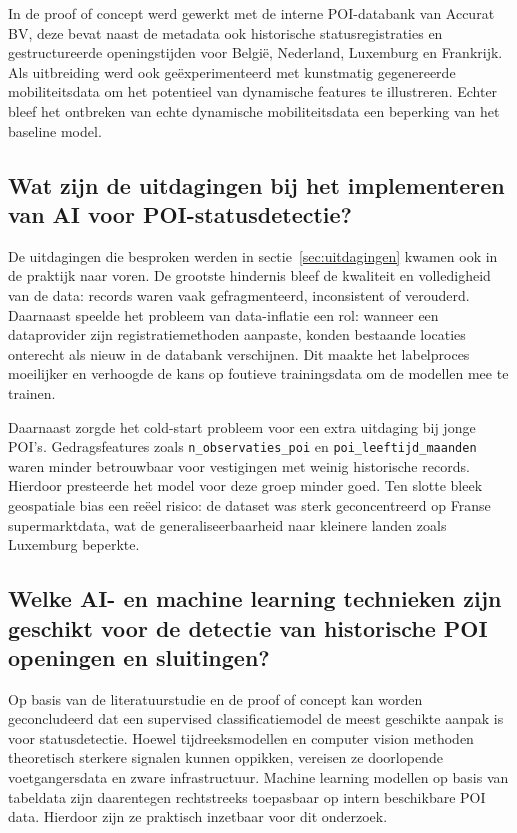 In de proof of concept werd gewerkt met de interne POI-databank van Accurat BV, deze bevat naast de metadata ook  historische statusregistraties en gestructureerde openingstijden voor België, Nederland, Luxemburg en Frankrijk. Als uitbreiding werd ook geëxperimenteerd met kunstmatig gegenereerde mobiliteitsdata om het potentieel van dynamische features te illustreren. Echter bleef het ontbreken van echte dynamische mobiliteitsdata een beperking van het baseline model.

\subsection{Wat zijn de uitdagingen bij het implementeren van AI voor POI-statusdetectie?}
De uitdagingen die besproken werden in sectie~\ref{sec:uitdagingen} kwamen ook in de praktijk naar voren. De grootste hindernis bleef de kwaliteit en volledigheid van de data: records waren vaak gefragmenteerd, inconsistent of verouderd. Daarnaast speelde het probleem van data-inflatie een rol: wanneer een dataprovider zijn registratiemethoden aanpaste, konden bestaande locaties onterecht als nieuw in de databank verschijnen. Dit maakte het labelproces moeilijker en verhoogde de kans op foutieve trainingsdata om de modellen mee te trainen.

Daarnaast zorgde het cold-start probleem voor een extra uitdaging bij jonge POI's. Gedragsfeatures zoals \texttt{n\_observaties\_poi} en \texttt{poi\_leeftijd\_maanden} waren minder betrouwbaar voor vestigingen met weinig historische records. Hierdoor presteerde het model voor deze groep minder goed. Ten slotte bleek geospatiale bias een reëel risico: de dataset was sterk geconcentreerd op Franse supermarktdata, wat de generaliseerbaarheid naar kleinere landen zoals Luxemburg beperkte.

\subsection{Welke AI- en machine learning technieken zijn geschikt voor de detectie van historische POI openingen en sluitingen?}
Op basis van de literatuurstudie en de proof of concept kan worden geconcludeerd dat een supervised classificatiemodel de meest geschikte aanpak is voor statusdetectie. Hoewel tijdreeksmodellen en computer vision methoden theoretisch sterkere signalen kunnen oppikken, vereisen ze doorlopende voetgangersdata en zware infrastructuur. Machine learning modellen op basis van tabeldata zijn daarentegen rechtstreeks toepasbaar op intern beschikbare POI data. Hierdoor zijn ze praktisch inzetbaar voor dit onderzoek.

